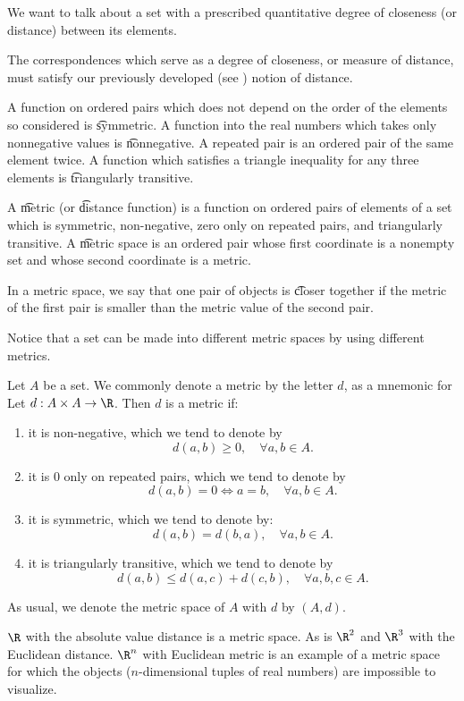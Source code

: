 

We want to talk about a set with a prescribed quantitative degree of closeness (or distance) between its elements.


The correspondences which serve as a degree of closeness, or measure of distance, must satisfy our previously developed (see ) notion of distance.

A function on ordered pairs which does not depend on the order of the elements so considered is \t{symmetric}.
A function into the real numbers which takes only nonnegative values is \t{nonnegative}.
A repeated pair is an ordered pair of the same element twice.
A function which satisfies a triangle inequality for any three elements is \t{triangularly transitive}.

A \t{metric} (or \t{distance function}) is a function on ordered pairs of elements of a set which is symmetric, non-negative, zero only on repeated pairs, and triangularly transitive.
A \t{metric space} is an ordered pair whose first coordinate is a nonempty set and whose second coordinate is a metric.

In a metric space, we say that one pair of objects is \t{closer} together if the metric of the first pair is smaller than the metric value of the second pair.

Notice that a set can be made into different metric spaces by using different metrics.


Let $A$ be a set.
We commonly denote a metric by the letter $d$, as a mnemonic for 
Let $d: A \times A \to \R$.
Then $d$ is a metric if:
  \begin{enumerate}
  \item it is non-negative, which we tend to denote by
      \[
d(a, b) \geq 0, \quad \forall a,b \in A.
      \]
  \item it is $0$ only on repeated pairs, which we tend to denote by
      \[
d(a, b) = 0 \iff a = b, \quad \forall a,b \in A.
      \]
  \item it is symmetric, which we tend to denote by:
      \[
d(a, b) = d(b, a), \quad \forall a,b \in A.
      \]
  \item it is triangularly transitive, which we tend to denote by
      \[
d(a, b) \leq d(a, c) + d(c, b), \quad \forall a,b,c \in A.
      \]
  \end{enumerate}
As usual, we denote the metric space of $A$ with $d$ by $(A, d)$.


$\R$ with the absolute value distance is a metric space.
As is $\R^2$ and $\R^3$ with the Euclidean distance.
$\R^n$ with Euclidean metric is an example of a metric space for which the objects ($n$-dimensional tuples of real numbers) are impossible to visualize.
